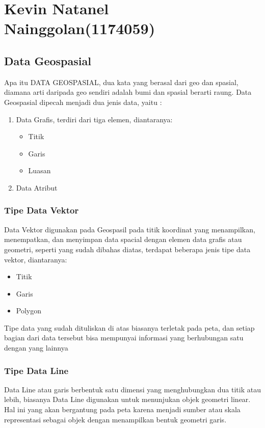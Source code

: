 \section{Kevin Natanel Nainggolan(1174059)}
\subsection{Data Geospasial}
Apa itu DATA GEOSPASIAL, dua kata yang berasal dari geo dan spasial, diamana arti daripada geo sendiri adalah bumi dan spasial berarti raung. Data Geospasial dipecah menjadi dua jenis data, yaitu : 
\begin {enumerate}
	\item Data Grafis, terdiri dari tiga elemen, diantaranya:
		\begin {itemize}
			\item Titik
			\item Garis
			\item Luasan
		\end {itemize}
	\item Data Atribut
\end {enumerate}

\subsubsection{Tipe Data Vektor}
Data Vektor digunakan pada Geospasil pada titik koordinat yang menampilkan, menempatkan, dan menyimpan data spacial dengan elemen data grafis atau geometri, seperti yang sudah dibahas diatas, terdapat beberapa jenis tipe data vektor, diantaranya: 
\begin {itemize}
	\item Titik
	\item Garis
	\item Polygon
\end {itemize}
Tipe data yang sudah dituliskan di atas biasanya terletak pada peta, dan setiap bagian dari data tersebut bisa mempunyai informasi yang berhubungan satu dengan yang lainnya

\subsubsection{Tipe Data Line}
Data Line atau garis berbentuk satu dimensi yang menghubungkan dua titik atau lebih, biasanya Data Line digunakan untuk menunjukan objek geometri linear. Hal ini yang akan bergantung pada peta karena menjadi sumber atau skala representasi sebagai objek dengan menampilkan bentuk geometri garis.

